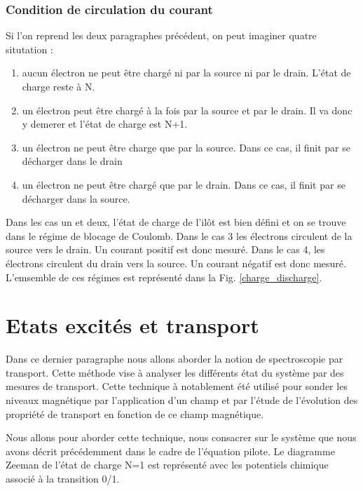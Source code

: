\subsubsection{Condition de circulation du courant}

Si l'on reprend les deux paragraphes précédent, on peut imaginer quatre situtation :
\begin{enumerate}
\item aucun électron ne peut \^etre chargé ni par la source ni par le drain. L'état de charge reste à N.
\item un électron peut \^etre chargé à la fois par la source et par le drain. Il va donc y demerer et l'état de charge est N+1.
\item un électron ne peut \^etre charge que par la source. Dans ce cas, il finit par se décharger dans le drain
\item un électron ne peut \^etre chargé que par le drain. Dans ce cas, il finit par se décharger dans la source.
\end{enumerate}
Dans les cas un et deux, l'état de charge de l'il\^ot est bien défini et on se trouve dans le régime de blocage de Coulomb. Dans le cas 3 les électrons circulent de la source vers le drain. Un courant positif est donc mesuré. Dans le cas 4, les électrons circulent du drain vers la source. Un courant négatif est donc mesuré. L'emsemble de ces régimes est représenté dans la Fig. \ref{charge_discharge}.










\section{Etats excités et transport}
Dans ce dernier paragraphe nous allons aborder la notion de spectroscopie par transport. Cette méthode vise à analyser les différents état du système par des mesures de transport. Cette technique à notablement été utilisé pour sonder les niveaux magnétique par l'application d'un champ et par l'étude de l'évolution des propriété de transport en fonction de ce champ magnétique.

Nous allons pour aborder cette technique, nous consacrer sur le système que nous avons décrit précédemment dans le cadre de l'équation pilote. Le diagramme Zeeman de l'état de charge N=1 est représenté avec les potentiels chimique associé à la transition 0/1.

